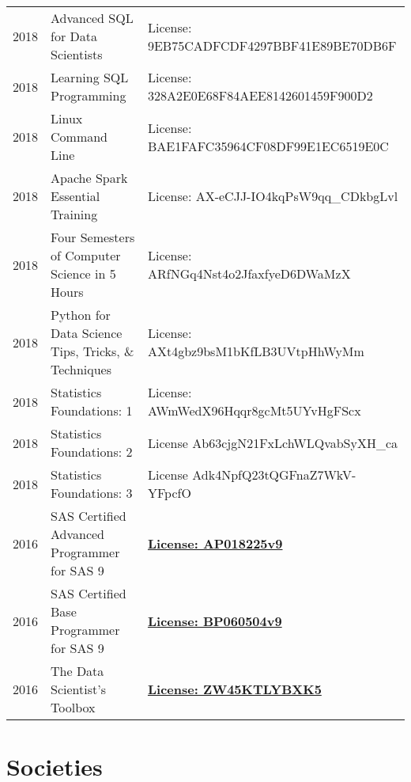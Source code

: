 \documentclass[]{template}
\begin{document}
\begin{tabular}{rll}

2018 & Advanced SQL for Data Scientists & License: 9EB75CADFCDF4297BBF41E89BE70DB6F \\
2018 & Learning SQL Programming & License: 328A2E0E68F84AEE8142601459F900D2\\
2018 & Linux Command Line & License: BAE1FAFC35964CF08DF99E1EC6519E0C\\

2018 & Apache Spark Essential Training & License: AX-eCJJ-IO4kqPsW9qq\_CDkbgLvl\\

2018 & Four Semesters of Computer Science in 5 Hours & License: ARfNGq4Nst4o2JfaxfyeD6DWaMzX\\


2018 & Python for Data Science Tips, Tricks, \& Techniques & License: AXt4gbz9bsM1bKfLB3UVtpHhWyMm\\

2018 & Statistics Foundations: 1 & License: AWmWedX96Hqqr8gcMt5UYvHgFScx \\

2018 & Statistics Foundations: 2 & License Ab63cjgN21FxLchWLQvabSyXH\_ca \\

2018 & Statistics Foundations: 3 & License Adk4NpfQ23tQGFnaZ7WkV-YFpcfO \\




2016 &  SAS Certified Advanced Programmer for SAS 9 &

\textbf{\href{https://people.sc.fsu.edu/~at15b/Achievements/SAS-ADVANCED.pdf}{License: AP018225v9}}\\

2016 &  SAS Certified Base Programmer for SAS 9 & \textbf{\href{https://people.sc.fsu.edu/~at15b/Achievements/SAS-BASE.pdf}{License: BP060504v9}}\\

2016 & The Data Scientist's Toolbox &
\textbf{\href{https://people.sc.fsu.edu/~at15b/Achievements/DataScientist.pdf}{License: ZW45KTLYBXK5}}

\end{tabular}

\sectionsep




\sectionsep
\hline
\sectionsep

\section{Societies} 
\end{document}
